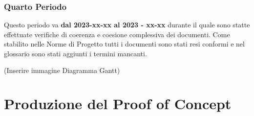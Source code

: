 \subsubsection{Quarto Periodo}
Questo periodo va \textbf{dal 2023-xx-xx  al  2023 - xx-xx} durante il quale sono statte effettuate verifiche di coerenza e coesione complessiva dei documenti. Come stabilito nelle Norme di Progetto tutti i documenti sono stati resi conformi e nel glossario sono stati aggiunti i termini mancanti.

(Inserire immagine Diagramma Gantt)

\section{Produzione del Proof of Concept}